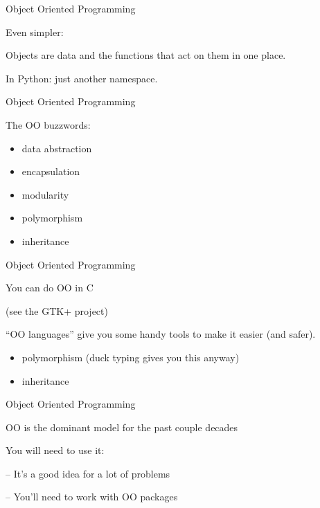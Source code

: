 \documentclass{beamer}
\begin{document}
\begin{frame}[fragile]{Object Oriented Programming}

\vfill
{\LARGE Even simpler:}

\vfill
{\Large 
Objects are data and the functions that act on them in one place.
}

\vfill
{\Large 
In Python: just another namespace.
}
\end{frame} 

\begin{frame}[fragile]{Object Oriented Programming}

\vfill
{\LARGE The OO buzzwords:

\vfill
\begin{itemize}
  \item data abstraction
  \item encapsulation
  \item modularity
  \item polymorphism
  \item inheritance
\end{itemize}
}
\end{frame} 

\begin{frame}[fragile]{Object Oriented Programming}

\vfill
{\LARGE You can do OO in C}

(see the GTK+ project)

\vfill
{\Large 
``OO languages'' give you some handy tools to make it easier (and safer).
}

\vfill
{\large
\begin{itemize}
  \item polymorphism (duck typing gives you this anyway)
  \item inheritance
\end{itemize}
}
\end{frame} 

\begin{frame}[fragile]{Object Oriented Programming}

\vfill
{\LARGE OO is the dominant model for the past couple decades

\vfill
You will need to use it:

\vfill
-- It's a good idea for a lot of problems

\vfill
-- You'll need to work with OO packages
}
\end{frame} 
\end{document}
